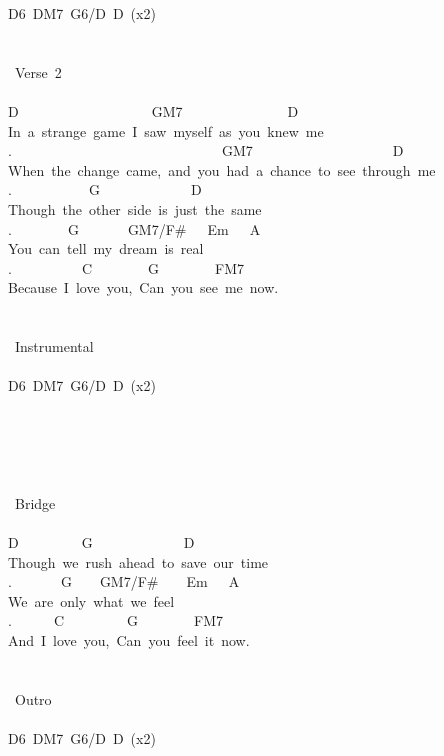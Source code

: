 {D6\ DM7\ G6/D\ D\ (x2)\\
\\
\\
\lbrack\ Verse\ 2\rbrack\\
\\
D\ \ \ \ \ \ \ \ \ \ \ \ \ \ \ \ \ \ \ GM7\ \ \ \ \ \ \ \ \ \ \ \ \ \ \ D\\
In\ a\ strange\ game\ I\ saw\ myself\ as\ you\ knew\ me\ \\
.\ \ \ \ \ \ \ \ \ \ \ \ \ \ \ \ \ \ \ \ \ \ \ \ \ \ \ \ \ \ GM7\ \ \ \ \ \ \ \ \ \ \ \ \ \ \ \ \ \ \ \ D\\
When\ the\ change\ came,\ and\ you\ had\ a\ chance\ to\ see\ through\ me\ \\
.\ \ \ \ \ \ \ \ \ \ \ G\ \ \ \ \ \ \ \ \ \ \ \ \ D\\
Though\ the\ other\ side\ is\ just\ the\ same\ \\
.\ \ \ \ \ \ \ \ G\ \ \ \ \ \ \ GM7/F\#\ \ \ Em\ \ \ A\\
You\ can\ tell\ my\ dream\ is\ real\\
.\ \ \ \ \ \ \ \ \ \ C\ \ \ \ \ \ \ \ G\ \ \ \ \ \ \ \ FM7\\
Because\ I\ love\ you,\ Can\ you\ see\ me\ now.\\
\\
\\
\lbrack\ Instrumental\rbrack\\
\\
D6\ DM7\ G6/D\ D\ (x2)\\
\\
\\
\\
\\
\\
\lbrack\ Bridge\rbrack\\
\\
D\ \ \ \ \ \ \ \ \ G\ \ \ \ \ \ \ \ \ \ \ \ \ D\\
Though\ we\ rush\ ahead\ to\ save\ our\ time\\
.\ \ \ \ \ \ \ G\ \ \ \ GM7/F\#\ \ \ \ Em\ \ \ A\\
We\ are\ only\ what\ we\ feel\ \\
.\ \ \ \ \ \ C\ \ \ \ \ \ \ \ \ G\ \ \ \ \ \ \ \ FM7\\
And\ I\ love\ you,\ Can\ you\ feel\ it\ now.\\
\\
\\
\lbrack\ Outro\rbrack\\
\\
D6\ DM7\ G6/D\ D\ (x2)}
